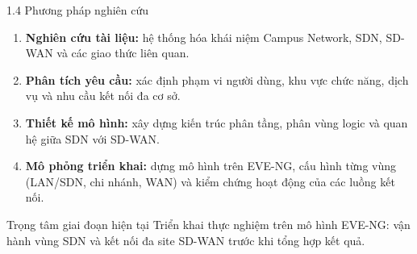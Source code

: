 \begin{frame}{1.4 Phương pháp nghiên cứu}
    \begin{enumerate}
        \item \textbf{Nghiên cứu tài liệu:} hệ thống hóa khái niệm Campus Network, SDN, SD-WAN và các giao thức liên quan.
        \vspace{0.12cm}
        \item \textbf{Phân tích yêu cầu:} xác định phạm vi người dùng, khu vực chức năng, dịch vụ và nhu cầu kết nối đa cơ sở.
        \vspace{0.12cm}
        \item \textbf{Thiết kế mô hình:} xây dựng kiến trúc phân tầng, phân vùng logic và quan hệ giữa SDN với SD-WAN.
        \vspace{0.12cm}
        \item \textbf{Mô phỏng triển khai:} dựng mô hình trên EVE-NG, cấu hình từng vùng (LAN/SDN, chi nhánh, WAN) và kiểm chứng hoạt động của các luồng kết nối.
    \end{enumerate}
    \vspace{0.15cm}
    \begin{block}{Trọng tâm giai đoạn hiện tại}
        Triển khai thực nghiệm trên mô hình EVE-NG: vận hành vùng SDN và kết nối đa site SD-WAN trước khi tổng hợp kết quả.
    \end{block}
\end{frame}
